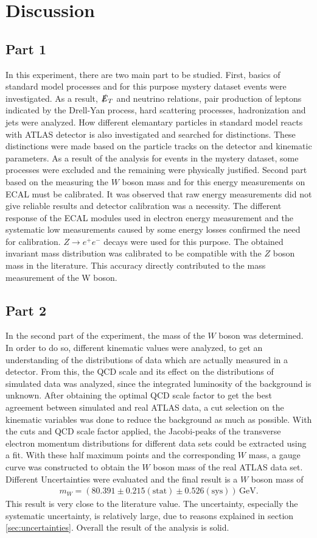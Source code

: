 \section{Discussion}
\subsection{Part 1}
In this experiment, there are two main part to be studied. First, basics of standard model processes and for this purpose mystery dataset events were investigated. As a result, $\slashed{E}_T$ and neutrino relations, pair production of leptons indicated by the Drell-Yan process, hard scattering processes, hadronization and jets were analyzed. How different elemantary particles in standard model reacts with ATLAS detector is also investigated and searched for distinctions. These distinctions were made based on the particle tracks on the detector and kinematic parameters. As a result of the analysis for events in the mystery dataset, some processes were excluded and the remaining were physically justified.
Second part based on the measuring the $W$ boson mass and for this energy measurements on ECAL must be calibrated. It was observed that raw energy measurements did not give reliable results and detector calibration was a necessity. The different response of the ECAL modules used in electron energy measurement and the systematic low measurements caused by some energy losses confirmed the need for calibration. $Z \rightarrow e^+e^-$  decays were used for this purpose. The obtained invariant mass distribution was calibrated to be compatible with the $Z$ boson mass in the literature. This accuracy directly contributed to the mass measurement of the W boson.

\subsection{Part 2}
In the second part of the experiment, the mass of the $W$ boson was determined. In order to do so, different kinematic values were analyzed, to get an understanding of 
the distributions of data which are actually measured in a detector. From this, the QCD scale and its effect on the distributions of simulated data was analyzed,
since the integrated luminosity of the background is unknown. After obtaining the optimal QCD scale factor to get the best agreement between simulated and real ATLAS data,
a cut selection on the kinematic variables was done to reduce the background as much as possible. With the cuts and QCD scale factor applied,
the Jacobi-peaks of the transverse electron momentum distributions for different data sets could be extracted using a fit.
With these half maximum points and the corresponding $W$ mass, a gauge curve was constructed to obtain the $W$ boson mass of the real ATLAS data set.
Different Uncertainties were evaluated and the final result is a $W$ boson mass of 
\begin{align*}
    m_W = (80.391 \pm 0.215(\mathrm{stat}) \pm 0.526 (\mathrm{sys}))\,\mathrm{GeV}.
\end{align*}
This result is very close to the literature value. The uncertainty, especially the systematic uncertainty, is relatively large,
due to reasons explained in section \ref{sec:uncertainties}. Overall the result of the analysis is solid. 